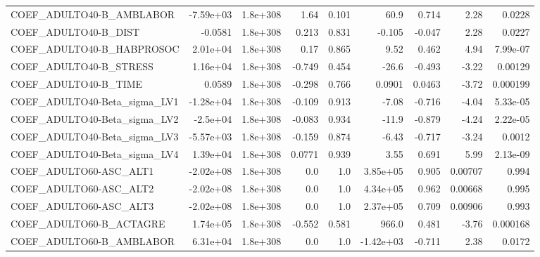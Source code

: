 \begin{tabular}{lrrrrrrrr}
COEF\_ADULTO40-B\_AMBLABOR          &   -7.59e+03 &     1.8e+308 &    1.64 &    0.101 &       60.9 &       0.714 &         2.28 &        0.0228 \\
COEF\_ADULTO40-B\_DIST              &     -0.0581 &     1.8e+308 &   0.213 &    0.831 &     -0.105 &      -0.047 &         2.28 &        0.0227 \\
COEF\_ADULTO40-B\_HABPROSOC         &    2.01e+04 &     1.8e+308 &    0.17 &    0.865 &       9.52 &       0.462 &         4.94 &      7.99e-07 \\
COEF\_ADULTO40-B\_STRESS            &    1.16e+04 &     1.8e+308 &  -0.749 &    0.454 &      -26.6 &      -0.493 &        -3.22 &       0.00129 \\
COEF\_ADULTO40-B\_TIME              &      0.0589 &     1.8e+308 &  -0.298 &    0.766 &     0.0901 &      0.0463 &        -3.72 &      0.000199 \\
COEF\_ADULTO40-Beta\_sigma\_LV1      &   -1.28e+04 &     1.8e+308 &  -0.109 &    0.913 &      -7.08 &      -0.716 &        -4.04 &      5.33e-05 \\
COEF\_ADULTO40-Beta\_sigma\_LV2      &    -2.5e+04 &     1.8e+308 &  -0.083 &    0.934 &      -11.9 &      -0.879 &        -4.24 &      2.22e-05 \\
COEF\_ADULTO40-Beta\_sigma\_LV3      &   -5.57e+03 &     1.8e+308 &  -0.159 &    0.874 &      -6.43 &      -0.717 &        -3.24 &        0.0012 \\
COEF\_ADULTO40-Beta\_sigma\_LV4      &    1.39e+04 &     1.8e+308 &  0.0771 &    0.939 &       3.55 &       0.691 &         5.99 &      2.13e-09 \\
COEF\_ADULTO60-ASC\_ALT1            &   -2.02e+08 &     1.8e+308 &     0.0 &      1.0 &   3.85e+05 &       0.905 &      0.00707 &         0.994 \\
COEF\_ADULTO60-ASC\_ALT2            &   -2.02e+08 &     1.8e+308 &     0.0 &      1.0 &   4.34e+05 &       0.962 &      0.00668 &         0.995 \\
COEF\_ADULTO60-ASC\_ALT3            &   -2.02e+08 &     1.8e+308 &     0.0 &      1.0 &   2.37e+05 &       0.709 &      0.00906 &         0.993 \\
COEF\_ADULTO60-B\_ACTAGRE           &    1.74e+05 &     1.8e+308 &  -0.552 &    0.581 &      966.0 &       0.481 &        -3.76 &      0.000168 \\
COEF\_ADULTO60-B\_AMBLABOR          &    6.31e+04 &     1.8e+308 &     0.0 &      1.0 &  -1.42e+03 &      -0.711 &         2.38 &        0.0172 \\

\end{tabular}
